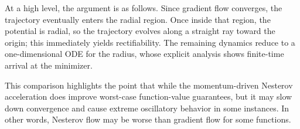 \documentclass{article}
\newtheorem{proposition}[theorem]{Proposition}
\theoremstyle{remark}
\newcommand{\R}{\mathbb{R}}
\newcommand{\dd}{\,\mathrm{d}}
\begin{document}
At a high level, the argument is as follows. Since gradient flow converges, the trajectory eventually enters the radial region. Once inside that region, the potential is radial, so the trajectory evolves along a straight ray toward the origin; this immediately yields rectifiability. The remaining dynamics reduce to a one-dimensional ODE for the radius, whose explicit analysis shows finite-time arrival at the minimizer.

This comparison highlights the point that while the momentum-driven Nesterov acceleration does improve worst-case function-value guarantees, but it may slow down convergence and cause extreme oscillatory behavior in some instances.
In other words, Nesterov flow may be worse than gradient flow for some functions.



\end{document}
